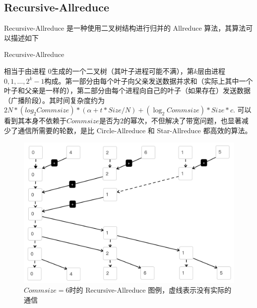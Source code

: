 \documentclass{article}
\begin{document}
\subsection{Recursive-Allreduce}
Recursive-Allreduce 是一种使用二叉树结构进行归并的 Allreduce 算法，其算法可以描述如下
\begin{algorithm}[H]
	\caption{Recursive-Allreduce}
	\begin{algorithmic}[1]
			\ENDIF
			\ENDFOR
			\ENDIF
			\ENDFOR 
	\end{algorithmic}
\end{algorithm}
	相当于由进程 $0$生成的一个二叉树（其叶子进程可能不满），第$k$层由进程$0,1,\dots,2^k-1$构成。第一部分由每个叶子向父亲发送数据并求和（实际上其中一个叶子和父亲是一样的），第二部分由每个进程向自己的叶子（如果存在）发送数据（广播阶段）。其时间复杂度约为 $2N*(log_2Commsize)*(\alpha+t*Size/N)+(\log_2 Commsize)*Size*c$. 可以看到其本身不依赖于$Commsize$是否为$2$的幂次，不但解决了带宽问题，也显著减少了通信所需要的轮数，是比 Circle-Allreduce 和 Star-Allreduce 都高效的算法。
	\begin{figure}[H]
		\centering
		\includegraphics[width=0.6\linewidth]{./fig/recursive}
		\caption{$Commsize = 6$时的 Recursive-Allreduce 图例，虚线表示没有实际的通信\label{fig:recursive}}
	\end{figure}
\end{document}

